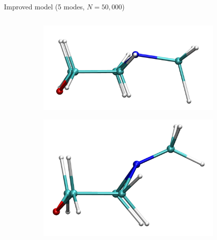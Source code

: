 \documentclass{beamer}
\begin{document}
\begin{frame}{Improved model (5 modes, $N=50{,}000$)}
	\begin{columns}
		\begin{column}{0.5\textwidth}
			\vspace{-5mm}
			\begin{figure}
				\centering
				\begin{subfigure}[b]{0.4\textwidth}
					\centering
					\includegraphics[width=\textwidth]{argmin_traj_50000_0+vstrongmodes_frame0_v2.png}
				\end{subfigure}
				\begin{subfigure}[b]{0.4\textwidth}
					\centering
					\includegraphics[width=\textwidth]{argmin_traj_50000_0+vstrongmodes_frame30_v2.png}
				\end{subfigure}
			\end{figure}
			\begin{figure}
				\centering
				\begin{subfigure}[b]{\textwidth}

\end{subfigure}
\end{figure}
\end{column}
\end{columns}
\end{frame}
\end{document}
